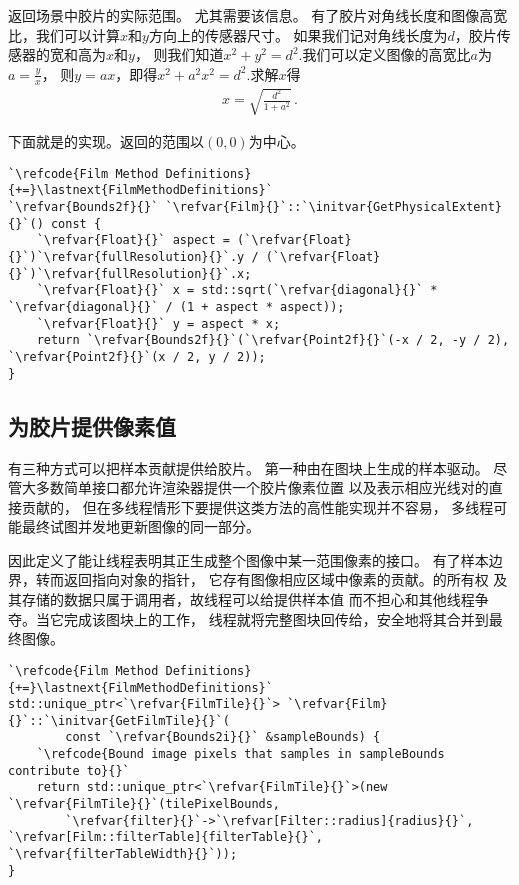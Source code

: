 返回场景中胶片的实际范围。
尤其需要该信息。
有了胶片对角线长度和图像高宽比，我们可以计算$x$和$y$方向上的传感器尺寸。
如果我们记对角线长度为$d$，胶片传感器的宽和高为$x$和$y$，
则我们知道$x^2+y^2=d^2$.我们可以定义图像的高宽比$a$为$\displaystyle a=\frac{y}{x}$，
则$y=ax$，即得$x^2+a^2x^2=d^2$.求解$x$得
\begin{align*}
    x=\sqrt{\frac{d^2}{1+a^2}}\, .
\end{align*}

下面就是的实现。返回的范围以$(0,0)$为中心。
\begin{lstlisting}
`\refcode{Film Method Definitions}{+=}\lastnext{FilmMethodDefinitions}`
`\refvar{Bounds2f}{}` `\refvar{Film}{}`::`\initvar{GetPhysicalExtent}{}`() const {
    `\refvar{Float}{}` aspect = (`\refvar{Float}{}`)`\refvar{fullResolution}{}`.y / (`\refvar{Float}{}`)`\refvar{fullResolution}{}`.x;
    `\refvar{Float}{}` x = std::sqrt(`\refvar{diagonal}{}` * `\refvar{diagonal}{}` / (1 + aspect * aspect));
    `\refvar{Float}{}` y = aspect * x;
    return `\refvar{Bounds2f}{}`(`\refvar{Point2f}{}`(-x / 2, -y / 2), `\refvar{Point2f}{}`(x / 2, y / 2));
}
\end{lstlisting}

\subsection{为胶片提供像素值}\label{sub:为胶片提供像素值}
有三种方式可以把样本贡献提供给胶片。
第一种由在图块上生成的样本驱动。
尽管大多数简单接口都允许渲染器提供一个胶片像素位置
以及表示相应光线对的直接贡献的，
但在多线程情形下要提供这类方法的高性能实现并不容易，
多线程可能最终试图并发地更新图像的同一部分。

因此定义了能让线程表明其正生成整个图像中某一范围像素的接口。
有了样本边界，转而返回指向对象的指针，
它存有图像相应区域中像素的贡献。的所有权
及其存储的数据只属于调用者，故线程可以给提供样本值
而不担心和其他线程争夺。当它完成该图块上的工作，
线程就将完整图块回传给，安全地将其合并到最终图像。
\begin{lstlisting}
`\refcode{Film Method Definitions}{+=}\lastnext{FilmMethodDefinitions}`
std::unique_ptr<`\refvar{FilmTile}{}`> `\refvar{Film}{}`::`\initvar{GetFilmTile}{}`(
        const `\refvar{Bounds2i}{}` &sampleBounds) {
    `\refcode{Bound image pixels that samples in sampleBounds contribute to}{}`
    return std::unique_ptr<`\refvar{FilmTile}{}`>(new `\refvar{FilmTile}{}`(tilePixelBounds,
        `\refvar{filter}{}`->`\refvar[Filter::radius]{radius}{}`, `\refvar[Film::filterTable]{filterTable}{}`, `\refvar{filterTableWidth}{}`));
}
\end{lstlisting}

